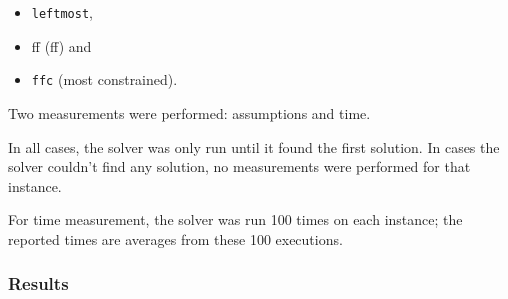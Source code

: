 \documentclass{article}
\newcommand{\code}[1]{\texttt{#1}}
\begin{document}
\begin{itemize}
\item \code{leftmost},
\item \acrshort{ff} (\acrlong{ff}) and
\item \code{ffc} (most constrained).
\end{itemize}

Two measurements were performed: assumptions and time.

In all cases, the solver was only run until it found the first solution.
In cases the solver couldn't find any solution,
no measurements were performed for that instance.

For time measurement, the solver was run 100 times on each instance;
the reported times are averages from these 100 executions.

\subsubsection{Results}


\printglossaries{}
\end{document}
